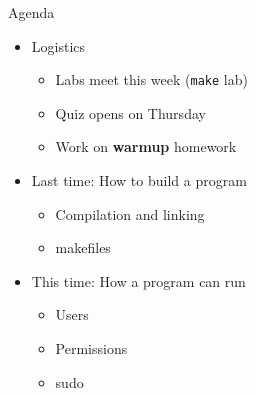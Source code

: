 \begin{frame}{Agenda}
    \begin{itemize}
        \item Logistics
            \begin{itemize}
            \item Labs meet this week (\texttt{make} lab)
            \item Quiz opens on Thursday
            \item Work on \textbf{warmup} homework
            \end{itemize}
        \item Last time: How to build a program
            \begin{itemize}
            \item Compilation and linking
            \item makefiles
            \end{itemize}
        \item This time: How a program can run
            \begin{itemize}
            \item Users
            \item Permissions
            \item sudo
            \end{itemize}
    \end{itemize}
\end{frame}